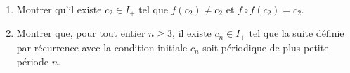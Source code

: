 \begin{enumerate}
  \item Montrer qu'il existe $c_2\in I_+$ tel que $f(c_2)\neq c_2$ et $f\circ f(c_2) = c_2$.
  
  \item Montrer que, pour tout entier $n\geq 3$, il existe $c_n\in I_+$ tel que la suite définie par récurrence avec la condition initiale $c_n$ soit périodique de plus petite période $n$.  
\end{enumerate}
